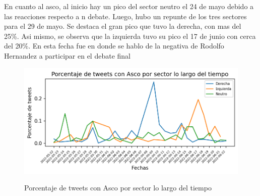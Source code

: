En cuanto al asco, al inicio hay un pico del sector neutro el 24 de mayo debido a las reacciones respecto a n debate. Luego, hubo un repunte de los tres sectores para el 29 de mayo. Se destaca el gran pico que tuvo la derecha, con mas del 25\%. Asi mismo, se observa que la izquierda tuvo su pico el 17 de junio con cerca del 20\%. En esta fecha fue en donde se hablo de la negativa de Rodolfo Hernandez a participar en el debate final

\begin{figure}[h]
	\caption{Porcentaje de tweets con Asco por sector lo largo del tiempo}
	\centering
	\includegraphics{../Images/Results/Porcentaje de tweets con Asco por sector lo largo del tiempo.png} 
	\label{figure:tweets_percent_Asco_tiempo}
\end{figure}














